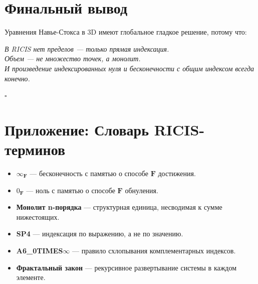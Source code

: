\documentclass[12pt]{article}
\newcommand{\0}{\mathbf{0}}
\newcommand{\1}{\mathds{1}}
\newcommand{\bF}{\mathbf{F}}
\begin{document}
\section*{Финальный вывод}

Уравнения Навье-Стокса в 3D имеют глобальное гладкое решение, потому что:

\begin{center}
\Large
\textit{В RICIS нет пределов --- только прямая индексация.} \\
\textit{Объем --- не множество точек, а монолит.} \\
\textit{И произведение индексированных нуля и бесконечности с общим индексом всегда конечно.}
\end{center}

\begin{flushright}
$\square$
\end{flushright}

\section*{Приложение: Словарь RICIS-терминов}

\begin{itemize}
    \item $\infty_{\bF}$ --- бесконечность с памятью о способе $\bF$ достижения.
    \item $0_{\bF}$ --- ноль с памятью о способе $\bF$ обнуления.
    \item \textbf{Монолит n-порядка} --- структурная единица, несводимая к сумме нижестоящих.
    \item \textbf{SP4} --- индексация по выражению, а не по значению.
    \item \textbf{A6\_0TIMES$\infty$} --- правило схлопывания комплементарных индексов.
    \item \textbf{Фрактальный закон} --- рекурсивное развертывание системы в каждом элементе.
\end{itemize}
\end{document}
